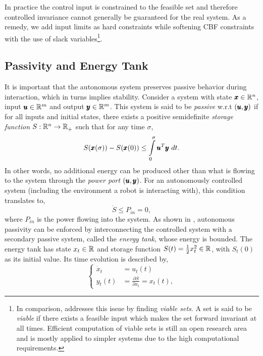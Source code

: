 In practice the control input is constrained to the feasible set and therefore controlled invariance cannot generally be guaranteed for the real system. As a remedy, we add input limits as hard constraints while softening CBF constraints with the use of slack variables\footnote{In comparison, \cite{gurriet2018towards} addresses this issue by finding \emph{viable sets}. A set is said to be \emph{viable} if there exists a feasible input which makes the set forward invariant at all times. Efficient computation of viable sets is still an open research area and is mostly applied to simpler systems due to the high computational requirements.}.

\subsection{Passivity and Energy Tank}
It is important that the autonomous system preserves passive behavior during interaction, which in turns implies stability. Consider a system with state $\pmb{x} \in \mathbb{R}^{n}$, input $\pmb{u} \in \mathbb{R}^{m}$ and output $\pmb{y} \in \mathbb{R}^{m}$. 
This system is said to be \emph{passive} w.r.t $(\pmb{u},\pmb{y})$ if for all inputs and initial states, there exists a positive semidefinite \emph{storage function} $S: \mathbb{R}^{n} \rightarrow \mathbb{R}^{}_+$ such that for any time $\sigma$,
\begin{equation}
    S(\pmb{x}(\sigma)) - S(\pmb{x}(0))\leq \int\limits_{0}^{\sigma} \pmb{u}^T \pmb{y}\ dt.  
\end{equation}
In other words, no additional energy can be produced other than what is flowing to the system through the \textit{power port} $(\pmb{u},\pmb{y})$.
For an autonomously controlled system (including the environment a robot is interacting with), this condition translates to, 
\begin{equation}
    \dot{S} \leq P_{in} = 0,
\end{equation}
where $P_{in}$ is the power flowing into the system. As shown in \cite{shahriari2018valve}, autonomous passivity can be enforced by interconnecting the controlled system with a secondary passive system, called the \emph{energy tank}, whose energy is bounded. The energy tank has state $x_t \in \mathbb{R}^{}$ and storage function $S(t) = \frac{1}{2} x_t^2 \in \mathbb{R}^{}$, with $S_t(0)$ as its initial value. Its time evolution is described by,
\begin{equation}
\begin{cases}
\dot{x}_t &= u_t(t) \\
y_t(t) &= \frac{\partial S}{\partial x_t} = x_t(t),
\end{cases}
\end{equation}
